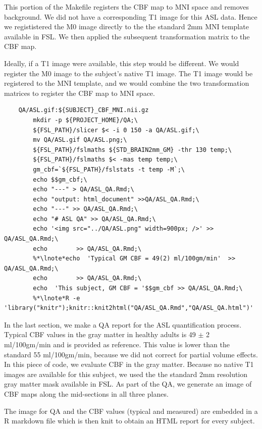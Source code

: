 This portion of the Makefile registers the CBF map to MNI space and
removes background. We did not have a corresponding T1 image for this
ASL data. Hence we regististered the M0 image directly to the the
standard 2mm MNI template available in FSL. We then applied the
subsequent transformation matrix to the CBF map. 

Ideally, if a T1 image were available, this step would be
different. We would register the M0 image to the subject's native T1
image. The T1 image would be registered to the MNI template, and we
would combine the two transformation matrices to register the CBF map
to MNI space.

\begin{lstlisting}
	QA/ASL.gif:${SUBJECT}_CBF_MNI.nii.gz
		mkdir -p ${PROJECT_HOME}/QA;\
		${FSL_PATH}/slicer $< -i 0 150 -a QA/ASL.gif;\
		mv QA/ASL.gif QA/ASL.png;\
		${FSL_PATH}/fslmaths ${STD_BRAIN2mm_GM} -thr 130 temp;\
		${FSL_PATH}/fslmaths $< -mas temp temp;\
		gm_cbf=`${FSL_PATH}/fslstats -t temp -M`;\
		echo $$gm_cbf;\
		echo "---" > QA/ASL_QA.Rmd;\
		echo "output: html_document" >>QA/ASL_QA.Rmd;\
		echo "---" >> QA/ASL_QA.Rmd;\
		echo "# ASL QA" >> QA/ASL_QA.Rmd;\
		echo '<img src="../QA/ASL.png" width=900px; />' >> QA/ASL_QA.Rmd;\
		echo        >> QA/ASL_QA.Rmd;\
		%*\lnote*echo  'Typical GM CBF = 49(2) ml/100gm/min'  >> QA/ASL_QA.Rmd;\
		echo        >> QA/ASL_QA.Rmd;\
		echo  'This subject, GM CBF = '$$gm_cbf >> QA/ASL_QA.Rmd;\
		%*\lnote*R -e 'library("knitr");knitr::knit2html("QA/ASL_QA.Rmd","QA/ASL_QA.html")'

\end{lstlisting}

In the last section, we make a QA report for the ASL quantification
process.  
\lnum{6} Typical CBF values in the gray matter in healthy
adults is 49 $\pm$ 2 ml/100gm/min and is provided as reference. This
value is lower than the standard 55 ml/100gm/min, because we did not
correct for partial volume effects. In this piece of code, we evaluate
CBF in the gray matter. Because no native T1 images are available for
this subject, we used the the standard 2mm resolution gray matter mask
available in FSL. As part of the QA, we generate an image of CBF maps
along the mid-sections in all three planes.

\lnum{7} The image for QA and the
CBF values (typical and measured) are embedded in a R markdown file
which is then knit to obtain an HTML report for every subject.
